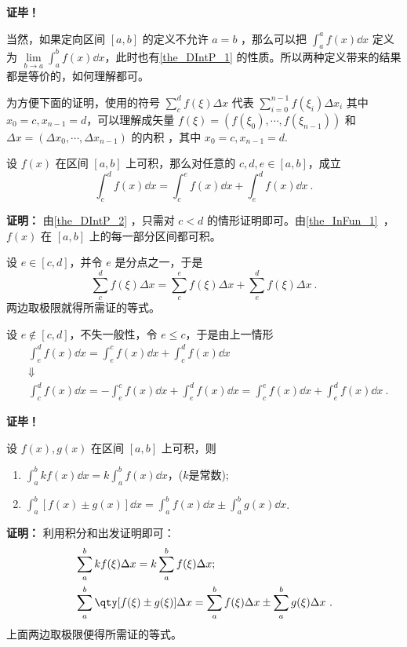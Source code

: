 \textbf{证毕！} 

当然，如果定向区间 $[a,b]$ 的定义不允许 $a=b$ ，那么可以把 $\int_a^a f(x)\dd x$ 定义为 $\lim\limits_{b\rightarrow a}\int_a^b f(x)\dd x$，此时也有\autoref{the_DIntP_1} 的性质。所以两种定义带来的结果都是等价的，如何理解都可。

为方便下面的证明，使用的符号 $\sum\limits_{c}^d f(\xi)\Delta x$ 代表 $\sum\limits_{i=0}^{n-1} f(\xi_i)\Delta x_i$ 其中 $x_0=c,x_{n-1}=d$，可以理解成矢量 $f(\xi)=(f(\xi_0),\cdots,f(\xi_{n-1}))$ 和 $\Delta x=(\Delta x_0,\cdots,\Delta x_{n-1})$ 的内积 ，其中 $x_0=c,x_{n-1}=d.$
\begin{theorem}{}
设 $f(x)$ 在区间 $[a,b]$ 上可积，那么对任意的 $c,d,e\in[a,b]$，成立
\begin{equation}
\int_c^d f(x)\dd x=\int_c^e f(x)\dd x+\int_e^d f(x)\dd x~.
\end{equation}
\end{theorem}
\textbf{证明：}
由\autoref{the_DIntP_2} ，只需对 $c<d$ 的情形证明即可。由\autoref{the_InFun_1}~，$f(x)$ 在 $[a,b]$ 上的每一部分区间都可积。

设 $e\in [c,d]$，并令 $e$ 是分点之一，于是
\begin{equation}
\sum_{c}^d f(\xi)\Delta x=\sum_c^e f(\xi)\Delta x+\sum_e^d f(\xi)\Delta x~.
\end{equation}
两边取极限就得所需证的等式。

设 $e\notin[c,d]$，不失一般性，令 $e\leq c$，于是由上一情形
\begin{equation}
\begin{aligned}
&\int_e^d f(x)\dd x=\int_e^c f(x)\dd x+\int_c^d f(x)\dd x\\
&\Downarrow\\
&\int_c^d f(x)\dd x=-\int_e^c f(x)\dd x+\int_e^d f(x)\dd x=\int_c^e f(x)\dd x+\int_e^d f(x)\dd x~.
\end{aligned}
\end{equation}

\textbf{证毕！}

\begin{theorem}{}
设 $f(x),g(x)$ 在区间 $[a,b]$ 上可积，则
\begin{enumerate}
\item $\int_a^b kf(x)\dd x=k\int_a^b f(x)\dd x$，($k$是常数);
\item $\int_a^b[f(x)\pm g(x)]\dd x=\int_a^b f(x)\dd x\pm\int_a^b g(x)\dd x$.
\end{enumerate}
\end{theorem}
\textbf{证明：}
利用积分和出发证明即可：
\begin{equation}
\begin{aligned}
&\sum_{a}^bkf(\xi)\Delta x=k\sum_{a}^bf(\xi)\Delta x;\\
&\sum_a^b \qty[f(\xi)\pm g(\xi)]\Delta x=\sum_a^bf(\xi)\Delta x\pm \sum_a^bg(\xi)\Delta x~.
\end{aligned}
\end{equation}
上面两边取极限便得所需证的等式。


